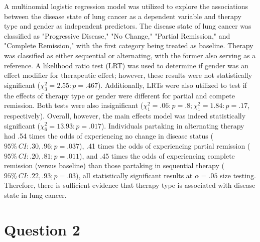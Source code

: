 \documentclass{article}
\begin{document}
A multinomial logistic regression model was utilized to explore the associations between the disease state of lung cancer as a dependent variable and therapy type and gender as independent predictors. The disease state of lung cancer was classified as "Progressive Disease," "No Change," "Partial Remission," and "Complete Remission," with the first category being treated as baseline. Therapy was classified as either sequential or alternating, with the former also serving as a reference. A likelihood ratio test (LRT) was used to determine if gender was an effect modifier for therapeutic effect; however, these results were not statistically significant ($\chi^2_3 = 2.55: p=.467$). Additionally, LRTs were also utilized to test if the effects of therapy type or gender were different for partial and compete remission. Both tests were also insignificant ($\chi^2_1 = .06: p=.8; \chi^2_1 = 1.84: p=.17$, respectively). Overall, however, the main effects model was indeed statistically significant ($\chi^2_6 = 13.93: p=.017$). Individuals partaking in alternating therapy had .54 times the odds of experiencing no change in disease status ($95 \%\ CI: .30, .96; p = .037$), .41 times the odds of experiencing partial remission ($95 \%\ CI: .20, .81; p = .011$), and .45 times the odds of experiencing complete remission (versus baseline) than those partaking in sequential therapy ($95 \%\ CI: .22, .93; p = .03$), all statistically significant results at $\alpha = .05$ size testing. Therefore, there is sufficient evidence that therapy type is associated with disease state in lung cancer.    


\section{Question 2}
\end{document}
